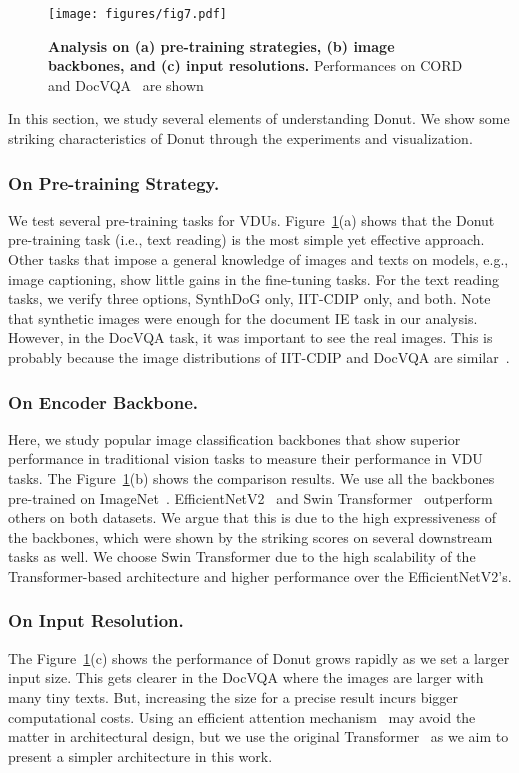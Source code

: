 \documentclass[runningheads]{llncs}
\newcommand\ours{{{\mbox{Donut}}}\xspace}
\begin{document}
\begin{figure}[t]
    \centering
    \texttt{[image: figures/fig7.pdf]}
    \caption{\textbf{Analysis on (a) pre-training strategies, (b) image backbones, and (c) input resolutions.} Performances on CORD~\cite{park2019cord} and DocVQA~\cite{mathew2021docvqa} are shown} \label{fig:analysis_ablation}
\end{figure}


In this section, we study several elements of understanding \ours. We show some striking characteristics of \ours through the experiments and visualization.


\subsubsection{On Pre-training Strategy.}
We test several pre-training tasks for VDUs. Figure~\ref{fig:analysis_ablation}(a) shows that the \ours pre-training task (i.e., text reading) is the most simple yet effective approach. Other tasks that impose a general knowledge of images and texts on models, e.g., image captioning, show little gains in the fine-tuning tasks.
For the text reading tasks, we verify three options, SynthDoG only, IIT-CDIP only, and both.
Note that synthetic images were enough for the document IE task in our analysis. 
However, in the DocVQA task, it was important to see the real images. 
This is probably because the image distributions of IIT-CDIP and DocVQA are similar~\cite{mathew2021docvqa}.


\subsubsection{On Encoder Backbone.}
Here, we study popular image classification backbones that show superior performance in traditional vision tasks to measure their performance in VDU tasks.
The Figure~\ref{fig:analysis_ablation}(b) shows the comparison results. We use all the backbones pre-trained on ImageNet~\cite{deng2009imagenet}.
EfficientNetV2~\cite{tan2021efficientnetv2} and Swin Transformer~\cite{Liu_2021_ICCV} outperform others on both datasets. We argue that this is due to the high expressiveness of the backbones, which were shown by the striking scores on several downstream tasks as well.
We choose Swin Transformer due to the high scalability of the Transformer-based architecture and higher performance over the EfficientNetV2's.

\subsubsection{On Input Resolution.}
The Figure~\ref{fig:analysis_ablation}(c) shows the performance of \ours grows rapidly as we set a larger input size. This gets clearer in the DocVQA where the images are larger with many tiny texts. But, increasing the size for a precise result incurs bigger computational costs. Using an efficient attention mechanism~\cite{wang2020linformer} may avoid the matter in architectural design, but we use the original Transformer~\cite{vaswani2017transformer} as we aim to present a simpler architecture in this work.
\end{document}
